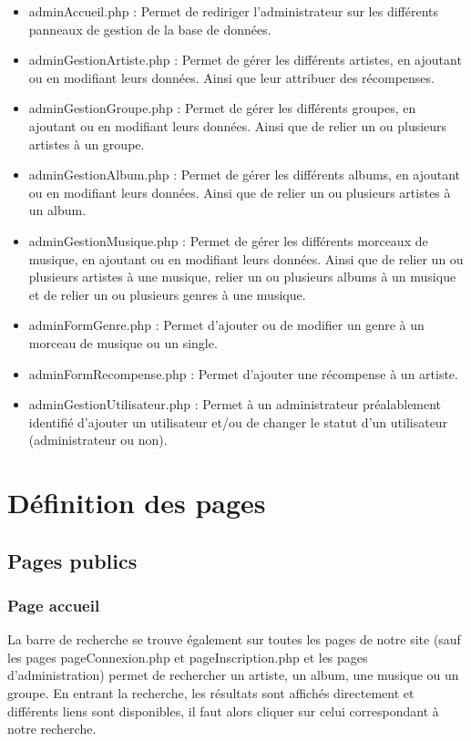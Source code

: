 	\begin{paragraphe}
		\begin{itemize}
			\item adminAccueil.php : Permet de rediriger l'administrateur sur les différents panneaux de gestion de la base de données.
			\item adminGestionArtiste.php : Permet de gérer les différents artistes, en ajoutant ou en modifiant leurs données. Ainsi que leur attribuer des récompenses.
			\item adminGestionGroupe.php : Permet de gérer les différents groupes, en ajoutant ou en modifiant leurs données. Ainsi que de relier un ou plusieurs artistes à un groupe.
			\item adminGestionAlbum.php : Permet de gérer les différents albums, en ajoutant ou en modifiant leurs données. Ainsi que de relier un ou plusieurs artistes à un album.
			\item adminGestionMusique.php : Permet de gérer les différents morceaux de musique, en ajoutant ou en modifiant leurs données. Ainsi que de relier un ou plusieurs artistes à une musique, relier un ou plusieurs albums à un musique et de relier un ou plusieurs genres à une musique.
			\item adminFormGenre.php : Permet d'ajouter ou de modifier un genre à un morceau de musique ou un single.
			\item adminFormRecompense.php : Permet d'ajouter une récompense à un artiste.
			\item adminGestionUtilisateur.php : Permet à un administrateur préalablement identifié d'ajouter un utilisateur et/ou de changer le statut d'un utilisateur (administrateur ou non).
		\end{itemize}
	\end{paragraphe}

\newpage

\section{Définition des pages}

	\subsection{Pages publics}
		\subsubsection{Page accueil}

			\begin{paragraphe}
				La barre de recherche se trouve également sur toutes les pages de notre site (sauf les pages pageConnexion.php et pageInscription.php et les pages d'administration) permet de rechercher un artiste, un album, une musique ou un groupe. En entrant la recherche, les résultats sont affichés directement et différents liens sont disponibles, il faut alors cliquer sur celui correspondant à notre recherche.
			\end{paragraphe}

